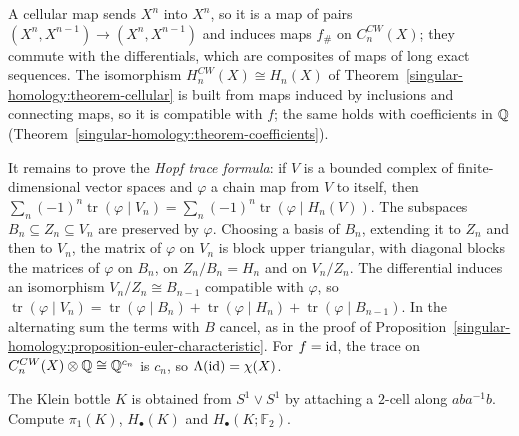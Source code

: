 \begin{solution}
A cellular map sends $X^n$ into $X^n$, so it is a map of pairs $(X^n, X^{n-1}) \to (X^n, X^{n-1})$ and induces maps $f_\#$ on $C^{CW}_n(X)$; they commute with the
differentials, which are composites of maps of long exact sequences. The isomorphism $H^{CW}_n(X) \cong H_n(X)$ of Theorem~\ref{singular-homology:theorem-cellular} is built
from maps induced by inclusions and connecting maps, so it is compatible with $f$; the same holds with coefficients in $\mathbb{Q}$ (Theorem~\ref{singular-homology:theorem-coefficients}).

It remains to prove the \emph{Hopf trace formula}: if $V$ is a bounded complex of finite-dimensional vector spaces and $\varphi$ a chain map from $V$ to itself, then
$\sum_n(-1)^n\operatorname{tr}(\varphi \mid V_n) = \sum_n(-1)^n\operatorname{tr}(\varphi \mid H_n(V))$. The subspaces $B_n \subseteq Z_n \subseteq V_n$ are preserved by $\varphi$.
Choosing a basis of $B_n$, extending it to $Z_n$ and then to $V_n$, the matrix of $\varphi$ on $V_n$ is block upper triangular, with diagonal blocks the matrices of $\varphi$
on $B_n$, on $Z_n/B_n = H_n$ and on $V_n/Z_n$. The differential induces an isomorphism $V_n/Z_n \cong B_{n-1}$ compatible with $\varphi$, so
$\operatorname{tr}(\varphi \mid V_n) = \operatorname{tr}(\varphi \mid B_n) + \operatorname{tr}(\varphi \mid H_n) + \operatorname{tr}(\varphi \mid B_{n-1})$. In the alternating sum the
terms with $B$ cancel, as in the proof of Proposition~\ref{singular-homology:proposition-euler-characteristic}. For $f = \mathrm{id}$, the trace on $C^{CW}_n(X) \otimes \mathbb{Q} \cong \mathbb{Q}^{c_n}$ is
$c_n$, so $\Lambda(\mathrm{id}) = \chi(X)$.
\end{solution}

\begin{exercise}\label{singular-homology:exercise-klein-bottle}
The Klein bottle $K$ is obtained from $S^1 \vee S^1$ by attaching a $2$-cell along $aba^{-1}b$. Compute $\pi_1(K)$, $H_\bullet(K)$ and $H_\bullet(K; \mathbb{F}_2)$.
\end{exercise}

